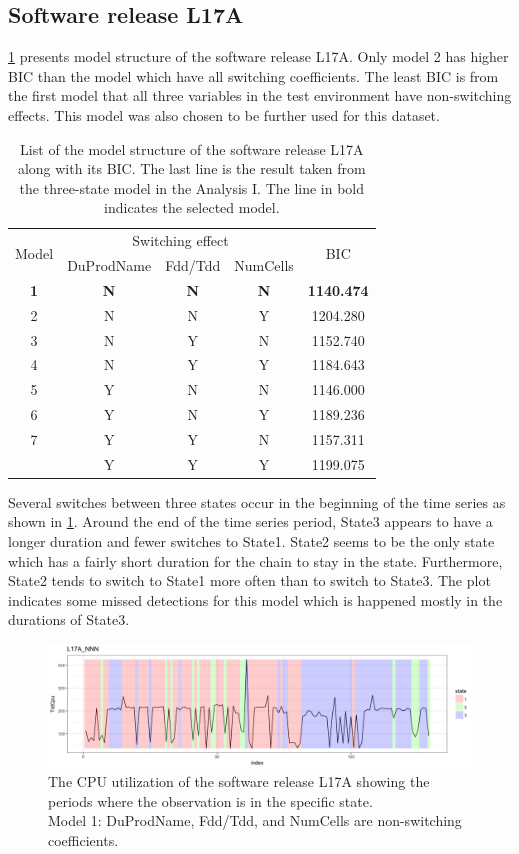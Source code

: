 \subsection{Software release L17A}

\ref{L17A_switch} presents model structure of the software release
L17A. Only model 2 has higher BIC than the model which have all switching
coefficients. The least BIC is from the first model that all three
variables in the test environment have non-switching effects. This
model was also chosen to be further used for this dataset.

\begin{table}[h]
\caption{List of the model structure of the software release L17A along with
its BIC. The last line is the result taken from the three-state model
in the Analysis I. The line in bold indicates the selected model.}
\label{L17A_switch}
\centering{}%
\begin{tabular}{ccccc}
\toprule 
\multirow{2}{*}{Model} & \multicolumn{3}{c}{Switching effect} & \multirow{2}{*}{BIC}\tabularnewline
\cmidrule{2-4} 
 & DuProdName & Fdd/Tdd & NumCells & \tabularnewline
\midrule
\midrule 
\textbf{1} & \textbf{N} & \textbf{N} & \textbf{N} & \textbf{1140.474}\tabularnewline
2 & N & N & Y & 1204.280\tabularnewline
3 & N & Y & N & 1152.740\tabularnewline
4 & N & Y & Y & 1184.643\tabularnewline
5 & Y & N & N & 1146.000\tabularnewline
6 & Y & N & Y & 1189.236\tabularnewline
7 & Y & Y & N & 1157.311\tabularnewline
\midrule
 & Y & Y & Y & 1199.075\tabularnewline
\bottomrule
\end{tabular}
\end{table}

Several switches between three states occur in the beginning of the
time series as shown in \ref{L17A_NNN}. Around the end of the time
series period, State3 appears to have a longer duration and fewer
switches to State1. State2 seems to be the only state which has a
fairly short duration for the chain to stay in the state. Furthermore,
State2 tends to switch to State1 more often than to switch to State3.
The plot indicates some missed detections for this model which is
happened mostly in the durations of State3. 

\begin{figure}[H]
\begin{centering}
\includegraphics[scale=0.35]{picture/L17A_NNN1}
\par\end{centering}
\caption{The CPU utilization of the software release L17A showing the periods
where the observation is in the specific state. \protect \\
Model 1: DuProdName, Fdd/Tdd, and NumCells are non-switching coefficients.}
\label{L17A_NNN}
\end{figure}


